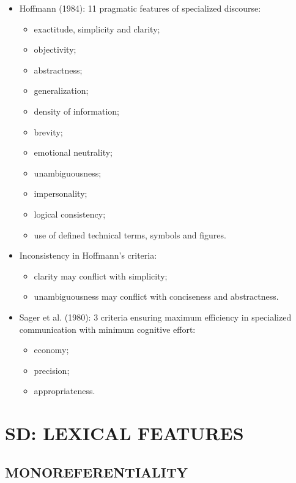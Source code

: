 \begin{itemize}

\item Hoffmann (1984): 11 pragmatic features of specialized discourse:

\begin{itemize}

\item exactitude, simplicity and clarity;
\item objectivity; 
\item abstractness;
\item generalization;
\item density of information;
\item brevity; 
\item emotional neutrality;
\item unambiguousness;
\item impersonality;
\item logical consistency; 
\item use of defined technical terms, symbols and figures. 

\end{itemize}

\item Inconsistency in Hoffmann’s criteria:

\begin{itemize}
\item clarity may conflict with simplicity;
\item unambiguousness may conflict with conciseness and abstractness.
\end{itemize}

\item Sager et al. (1980): 3 criteria ensuring maximum efficiency in specialized communication with minimum cognitive effort:

\begin{itemize}
\item economy;
\item precision;
\item appropriateness.
\end{itemize}

\end{itemize}

\section{SD: LEXICAL FEATURES}

\subsection{MONOREFERENTIALITY}

